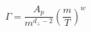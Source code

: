 \begin{equation}
\Gamma  = \frac{A_p}{m^{d_\perp-2}} \left(\frac{m}{T} \right )^{w}
\label{intrate}
\end{equation}

